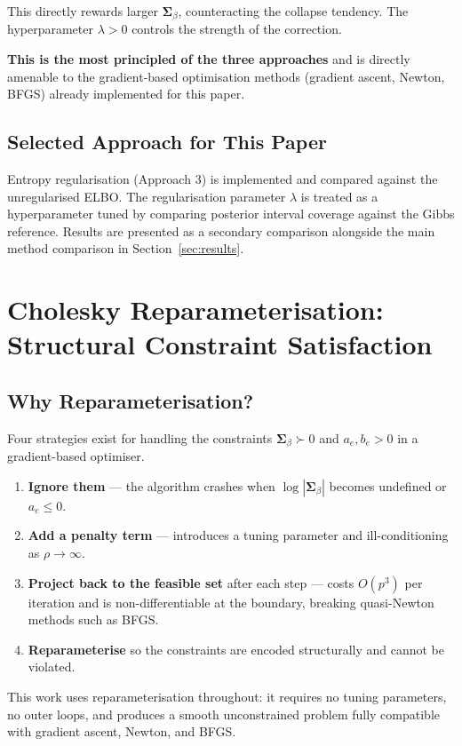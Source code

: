 \documentclass[11pt,a4paper]{article}
\begin{document}
This directly rewards larger $\bm{\Sigma}_\beta$, counteracting the collapse tendency. The hyperparameter $\lambda > 0$ controls the strength of the correction.

\textbf{This is the most principled of the three approaches} and is directly amenable to the gradient-based optimisation methods (gradient ascent, Newton, BFGS) already implemented for this paper.

\subsection*{Selected Approach for This Paper}

Entropy regularisation (Approach 3) is implemented and compared against the unregularised ELBO. The regularisation parameter $\lambda$ is treated as a hyperparameter tuned by comparing posterior interval coverage against the Gibbs reference. Results are presented as a secondary comparison alongside the main method comparison in Section~\ref{sec:results}.



\section{Cholesky Reparameterisation: Structural Constraint Satisfaction}\label{app:cholesky}

\subsection*{Why Reparameterisation?}

Four strategies exist for handling the constraints $\bm{\Sigma}_\beta \succ 0$ and $a_e, b_e > 0$ in a gradient-based optimiser.
\begin{enumerate}
  \item \textbf{Ignore them} --- the algorithm crashes when $\log|\bm{\Sigma}_\beta|$ becomes undefined or $a_e \leq 0$.
  \item \textbf{Add a penalty term} --- introduces a tuning parameter and ill-conditioning as $\rho \to \infty$.
  \item \textbf{Project back to the feasible set} after each step --- costs $O(p^3)$ per iteration and is non-differentiable at the boundary, breaking quasi-Newton methods such as BFGS.
  \item \textbf{Reparameterise} so the constraints are encoded structurally and cannot be violated.
\end{enumerate}
This work uses reparameterisation throughout: it requires no tuning parameters, no outer loops, and produces a smooth unconstrained problem fully compatible with gradient ascent, Newton, and BFGS.
\end{document}
